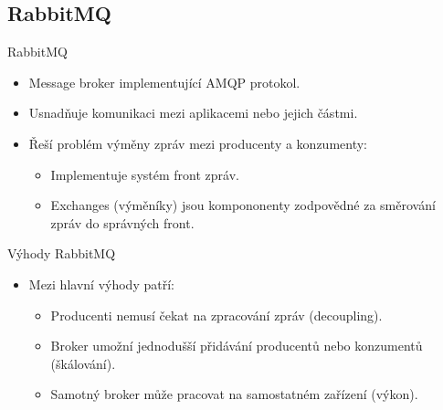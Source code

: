 \documentclass{beamer}
\begin{document}
\subsection{RabbitMQ}
\begin{frame}{RabbitMQ}
	\begin{itemize}
		\item Message broker implementující AMQP protokol.
		\item Usnadňuje komunikaci mezi aplikacemi nebo jejich částmi.
		\item Řeší problém výměny zpráv mezi producenty a konzumenty:
		\begin{itemize}
			\item [\textendash] Implementuje systém front zpráv.
			\item [\textendash] Exchanges (výměníky) jsou kompononenty zodpovědné za směrování zpráv 					  do správných front.
		\end{itemize}
	\end{itemize}

\end{frame}

\begin{frame}{Výhody RabbitMQ}
	\begin{itemize}
		\item Mezi hlavní výhody patří:
			\begin{itemize}
				\item [\textendash] Producenti nemusí čekat na zpracování zpráv (decoupling).
				\item [\textendash] Broker umožní jednodušší přidávání producentů nebo											  konzumentů (škálování).
				\item [\textendash] Samotný broker může pracovat na samostatném zařízení (výkon).
			\end{itemize}
	\end{itemize}
\end{frame}
\end{document}
